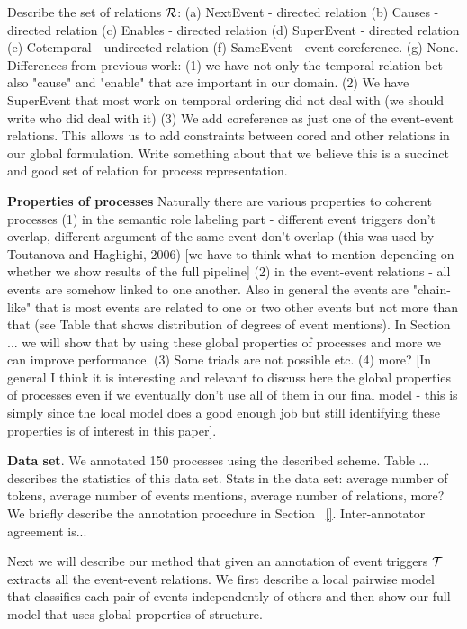 Describe the set of relations $\mathcal{R}$: (a) NextEvent - directed relation (b) Causes - directed relation (c) Enables - directed relation (d) SuperEvent - directed relation (e) Cotemporal - undirected relation (f) SameEvent - event coreference. (g) None. Differences from previous work: (1) we have not only the temporal relation bet also "cause" and "enable" that are important in our domain. (2) We have SuperEvent that most work on temporal ordering did not deal with (we should write who did deal with it) (3) We add coreference as just one of the event-event relations. This allows us to add constraints between cored and other relations in our global formulation. Write something about that  we believe this is a succinct and good set of relation for process representation.

\textbf{Properties of processes} Naturally there are various properties to coherent processes (1) in the semantic role labeling part - different event triggers don't overlap, different argument of the same event don't overlap (this was used by Toutanova and Haghighi, 2006) [we have to think what to mention depending on whether we show results of the full pipeline] (2) in the event-event relations - all events are somehow linked to one another. Also in general the events are "chain-like" that is most events are related to one or two other events but not more than that (see Table that shows distribution of degrees of event mentions). In Section ... we will show that by using these global properties of processes and more we can improve performance. (3) Some triads are not possible etc. (4) more? [In general I think it is interesting and relevant to discuss here the global properties of processes even if we eventually don't use all of them in our final model - this is simply since the local model does a good enough job but still identifying these properties is of interest in this paper].

\textbf{Data set}. We annotated 150 processes using the described scheme. Table ... describes the statistics of this data set. 
Stats in the data set: average number of tokens, average number of events mentions, average number of relations, more?
We briefly describe the annotation procedure in Section ~\ref{}. Inter-annotator agreement is...

Next we will describe our method that given an annotation of event triggers $\mathcal{T}$ extracts all the event-event relations. We first describe a local pairwise model that classifies each pair of events independently of others and then show our full model that uses global properties of structure.